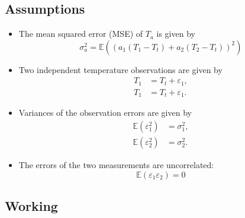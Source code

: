 \subsection{Assumptions}
\label{sub:mse:assumptions}

\begin{itemize}
    \item The mean squared error (MSE) of $T_a$ is given by
    \begin{equation}
        \sigma_a^2 = \mathbb{E} \left( \left( a_1 \left( T_1 - T_t \right) + a_2 \left( T_2 - T_t \right) \right)^2 \right) \label{eq:ta_mse}
    \end{equation}
    \item Two independent temperature observations are given by
    \begin{subequations}
        \begin{align}
        T_1 &= T_t + \varepsilon_1, \\
        T_1 &= T_t + \varepsilon_1.
        \end{align}
        \label{:eq:t_independence}
    \end{subequations}
    \item Variances of the observation errors are given by
    \begin{subequations}
        \begin{align}
            \mathbb{E}(\varepsilon_1^2) &= \sigma_1^2, \\
            \mathbb{E}(\varepsilon_2^2) &= \sigma_2^2.
        \end{align}
        \label{eq:t_var}
    \end{subequations}
    \item The errors of the two measurements are uncorrelated:
    \begin{equation}
        \mathbb{E}(\varepsilon_1 \varepsilon_2) = 0 \label{eq:t_uncorrelated}
    \end{equation}
\end{itemize}

\subsection{Working}
\label{sub:mse:working}

